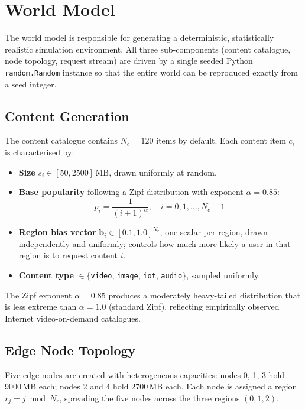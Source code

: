 \documentclass[12pt]{article}
\begin{document}
\section{World Model}
\label{sec:world}

The world model is responsible for generating a deterministic, statistically realistic simulation environment. All three sub-components (content catalogue, node topology, request stream) are driven by a single seeded Python \texttt{random.Random} instance so that the entire world can be reproduced exactly from a seed integer.

\subsection{Content Generation}

The content catalogue contains $N_c = 120$ items by default. Each content item $c_i$ is characterised by:

\begin{itemize}[noitemsep]
  \item \textbf{Size} $s_i \in [50, 2500]$\,MB, drawn uniformly at random.
  \item \textbf{Base popularity} following a Zipf distribution with exponent $\alpha = 0.85$:
    \begin{equation}
      p_i = \frac{1}{(i+1)^{\alpha}}, \quad i = 0, 1, \ldots, N_c - 1.
    \end{equation}
  \item \textbf{Region bias vector} $\mathbf{b}_i \in [0.1, 1.0]^{N_r}$, one scalar per region, drawn independently and uniformly; controls how much more likely a user in that region is to request content $i$.
  \item \textbf{Content type} $\in \{$\texttt{video}, \texttt{image}, \texttt{iot}, \texttt{audio}$\}$, sampled uniformly.
\end{itemize}

The Zipf exponent $\alpha = 0.85$ produces a moderately heavy-tailed distribution that is less extreme than $\alpha = 1.0$ (standard Zipf), reflecting empirically observed Internet video-on-demand catalogues.

\subsection{Edge Node Topology}

Five edge nodes are created with heterogeneous capacities: nodes 0, 1, 3 hold 9000\,MB each; nodes 2 and 4 hold 2700\,MB each. Each node is assigned a region $r_j = j \bmod N_r$, spreading the five nodes across the three regions $(0, 1, 2)$.
\end{document}
